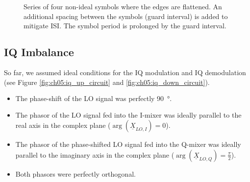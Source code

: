 \begin{refsection}
\begin{figure}[H]
	\caption[Series of four non-ideal symbols with additional spacing]{Series of four non-ideal symbols where the edges are flattened. An additional spacing between the symbols (guard interval) is added to mitigate \acs{ISI}. The symbol period is prolonged by the guard interval.}
\end{figure}

\subsection{IQ Imbalance}

So far, we assumed ideal conditions for the IQ modulation and IQ demodulation (see Figure \ref{fig:ch05:iq_up_circuit} and \ref{fig:ch05:iq_down_circuit}).
\begin{itemize}
	\item The phase-shift of the \ac{LO} signal was perfectly \SI{90}{\degree}.
	\item The phasor of the \ac{LO} signal fed into the \ac{I}-mixer was ideally parallel to the real axis in the complex plane ($\arg\left(\underline{X}_{LO,I}\right) = 0$).
	\item The phasor of the phase-shifted \ac{LO} signal fed into the \ac{Q}-mixer was ideally parallel to the imaginary axis in the complex plane ($\arg\left(\underline{X}_{LO,Q}\right) = \frac{\pi}{2}$).
	\item Both phasors were perfectly orthogonal.
\end{itemize}

\begin{figure}[H]
	\centering
	
\end{figure}
\end{refsection}

